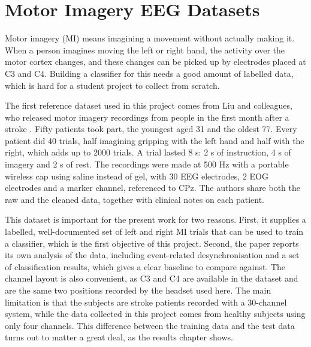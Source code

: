 \section{Motor Imagery EEG Datasets}
\label{sec:mi_datasets}

Motor imagery (MI) means imagining a movement without actually making it. When a person
imagines moving the left or right hand, the activity over the motor cortex changes, and
these changes can be picked up by electrodes placed at C3 and C4. Building a classifier for
this needs a good amount of labelled data, which is hard for a student project to collect
from scratch.

The first reference dataset used in this project comes from Liu and colleagues, who
released motor imagery recordings from people in the first month after a stroke
\cite{liu2024mi}. Fifty patients took part, the youngest aged 31 and the oldest 77. Every
patient did 40 trials, half imagining gripping with the left hand and half with the right,
which adds up to 2000 trials. A trial lasted 8 s: 2 s of instruction, 4 s of imagery and
2 s of rest. The recordings were made at 500 Hz with a portable wireless cap using saline
instead of gel, with 30 EEG electrodes, 2 EOG electrodes and a marker channel, referenced
to CPz. The authors share both the raw and the cleaned data, together with clinical notes
on each patient.

This dataset is important for the present work for two reasons. First, it supplies a
labelled, well-documented set of left and right MI trials that can be used to train a
classifier, which is the first objective of this project. Second, the paper reports its own
analysis of the data, including event-related desynchronisation and a set of classification
results, which gives a clear baseline to compare against. The channel layout is also
convenient, as C3 and C4 are available in the dataset and are the same two positions
recorded by the headset used here. The main limitation is that the subjects are stroke
patients recorded with a 30-channel system, while the data collected in this project comes
from healthy subjects using only four channels. This difference between the training data
and the test data turns out to matter a great deal, as the results chapter shows.

